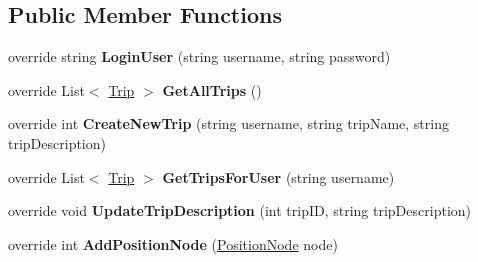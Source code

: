 \subsection*{Public Member Functions}
\begin{DoxyCompactItemize}
\item 
\hypertarget{class_tripi_w_c_f_1_1_service_1_1_trip_service_volatile_a479ebeb10c66e04ce7d1566f627c70d5}{
override string {\bfseries LoginUser} (string username, string password)}
\label{class_tripi_w_c_f_1_1_service_1_1_trip_service_volatile_a479ebeb10c66e04ce7d1566f627c70d5}

\item 
\hypertarget{class_tripi_w_c_f_1_1_service_1_1_trip_service_volatile_aa670b5145f4d5df277066193a7104182}{
override List$<$ \hyperlink{class_tripi_w_c_f_1_1_service_1_1_trip}{Trip} $>$ {\bfseries GetAllTrips} ()}
\label{class_tripi_w_c_f_1_1_service_1_1_trip_service_volatile_aa670b5145f4d5df277066193a7104182}

\item 
\hypertarget{class_tripi_w_c_f_1_1_service_1_1_trip_service_volatile_a5fea712361d4c38656c2aa4e03d943f8}{
override int {\bfseries CreateNewTrip} (string username, string tripName, string tripDescription)}
\label{class_tripi_w_c_f_1_1_service_1_1_trip_service_volatile_a5fea712361d4c38656c2aa4e03d943f8}

\item 
\hypertarget{class_tripi_w_c_f_1_1_service_1_1_trip_service_volatile_ae9e79423defb2defc9ef5b3d83078c03}{
override List$<$ \hyperlink{class_tripi_w_c_f_1_1_service_1_1_trip}{Trip} $>$ {\bfseries GetTripsForUser} (string username)}
\label{class_tripi_w_c_f_1_1_service_1_1_trip_service_volatile_ae9e79423defb2defc9ef5b3d83078c03}

\item 
\hypertarget{class_tripi_w_c_f_1_1_service_1_1_trip_service_volatile_ab9084e86f30df85a6be78d7537d8165c}{
override void {\bfseries UpdateTripDescription} (int tripID, string tripDescription)}
\label{class_tripi_w_c_f_1_1_service_1_1_trip_service_volatile_ab9084e86f30df85a6be78d7537d8165c}

\item 
\hypertarget{class_tripi_w_c_f_1_1_service_1_1_trip_service_volatile_a5c7e50de95f599fe082ca8728ba7658a}{
override int {\bfseries AddPositionNode} (\hyperlink{class_tripi_w_c_f_1_1_service_1_1_position_node}{PositionNode} node)}
\label{class_tripi_w_c_f_1_1_service_1_1_trip_service_volatile_a5c7e50de95f599fe082ca8728ba7658a}


\end{DoxyCompactItemize}
